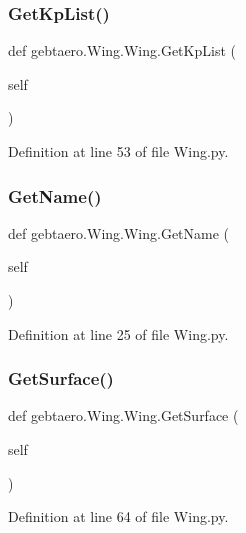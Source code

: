 \subsubsection{\texorpdfstring{Get\+Kp\+List()}{GetKpList()}}
{\footnotesize\ttfamily def gebtaero.\+Wing.\+Wing.\+Get\+Kp\+List (\begin{DoxyParamCaption}\item[{}]{self }\end{DoxyParamCaption})}



Definition at line 53 of file Wing.\+py.

\mbox{\label{classgebtaero_1_1_wing_1_1_wing_a180f53c7c326569cc0c8e8c78a3a0b2a}} 
\subsubsection{\texorpdfstring{Get\+Name()}{GetName()}}
{\footnotesize\ttfamily def gebtaero.\+Wing.\+Wing.\+Get\+Name (\begin{DoxyParamCaption}\item[{}]{self }\end{DoxyParamCaption})}



Definition at line 25 of file Wing.\+py.

\mbox{\label{classgebtaero_1_1_wing_1_1_wing_af0be9af67eb300ebc83262025f6c80af}} 
\subsubsection{\texorpdfstring{Get\+Surface()}{GetSurface()}}
{\footnotesize\ttfamily def gebtaero.\+Wing.\+Wing.\+Get\+Surface (\begin{DoxyParamCaption}\item[{}]{self }\end{DoxyParamCaption})}



Definition at line 64 of file Wing.\+py.

